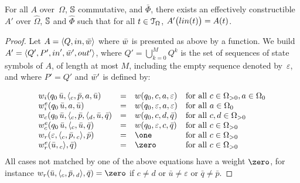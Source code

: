 \begin{proposition}\label{lem:SWTA}
For all \SWTA $A$ over~$\Omega$, $\mathbb{S}$ commutative, and $\bar\Phi$,
there exists an effectively constructible \SWVPA $A'$ over
$\hat\Omega$, $\mathbb{S}$ and $\hat\Phi$
such that for all $t \in \mathcal{T}_\Omega$, $A'\bigl(\lin(t)\bigr) = A(t)$.
\end{proposition}
%
\begin{proof}
Let $A = \< Q, \init, \bar{\wei} >$ where $\bar{\wei}$ is presented as above by a function.
We build
$A' = \< Q', P', \init', \bar{\wei}', \final' >$,
where $Q' = \bigcup_{k=0}^{M} Q^k$ is the set of sequences of state symbols of $A$,
of length at most $M$, including the empty sequence denoted by~$\varepsilon$,
and where $P' = Q'$ and $\bar{\wei}'$ is defined by:

\[
\begin{array}{lcll}
\weii(q_0\, \bar{u}, {\call{c}}, \bar{p}, a, \bar{u}) & = & \wei(q_0, c, a, \varepsilon) &
\mathrm{for~all~} c \in \Omega_{>0}, a \in \Omega_0\\ %
%
\weiei(q_0\,\bar{u}, a, \bar{u}) & = & \wei(q_0, \varepsilon, a, \varepsilon) &
\mathrm{for~all~} a \in \Omega_0\\
%
\weic(q_0\,\bar{u}, {\call{c}}, \bar{p}, \call{d}, \bar{u}, \bar{q}) & = & \wei(q_0, c, d, \bar{q}) &
\mathrm{for~all~} c, d \in \Omega_{>0}\\ %
%
\weiec(q_0\,\bar{u}, \call{c}, \bar{u}, \bar{q}) & = & \wei(q_0, \varepsilon, c, \bar{q}) &
\mathrm{for~all~} c \in \Omega_{>0}\\
%
\weir(\varepsilon, {\call{c}}, \bar{p}, {\return{c}}, \bar{p}) & = & \one &
\mathrm{for~all~}  c \in \Omega_{>0}\\ %
%
\weier(\bar{u}, {\return{c}}, \bar{q}) & = & \zero &
\mathrm{for~all~}  c \in \Omega_{>0}
\end{array}
\]
\noindent
All cases not matched by one of the above equations have a weight $\zero$,
for instance  %
$\weir(\bar{u}, {\call{c}}, \bar{p}, {\return{d}}, \bar{q}) = \zero$
if $c \neq d$
or $\bar{u} \neq \varepsilon$
or $\bar{q} \neq \bar{p}$.
%
\end{proof}

